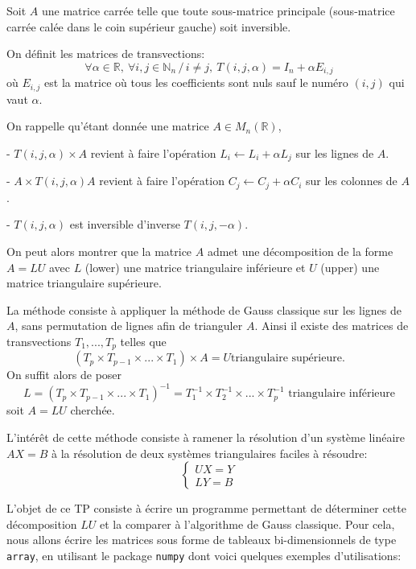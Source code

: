 \vskip1cm

Soit $A$ une matrice carrée telle que toute sous-matrice principale (sous-matrice carrée calée dans le coin supérieur gauche) soit inversible.

On définit les matrices de transvections: $$\forall \alpha\in {\mathbb R},\ \forall i,j\in {\mathbb N}_n\,/\,  i\ne j , \ T(i,j,\alpha)=I_n+\alpha E_{i,j}$$
où $E_{i,j}$ est la matrice où tous les coefficients sont nuls sauf le numéro $(i,j)$ qui vaut $\alpha$.

\medskip 

On rappelle qu'étant donnée une matrice $A\in M_{n}(\mathbb{R})$, 

- $T(i,j,\alpha)\times A$ revient à faire l'opération $L_i\leftarrow L_i+\alpha L_j$ sur les lignes de $A$.

- $A\times T(i,j,\alpha)A$ revient à faire l'opération $C_j\leftarrow C_j+\alpha C_i$ sur les colonnes de $A$.

- $T(i,j,\alpha)$ est inversible d'inverse $T(i,j,-\alpha)$.

\medskip 

On peut alors montrer que la matrice $A$ admet une décomposition de la forme $A=LU$ avec $L$ (lower) une matrice triangulaire inférieure et $U$ (upper) une matrice triangulaire supérieure.

\medskip 

La méthode consiste à appliquer la méthode de Gauss classique sur les lignes de $A$, sans permutation de lignes afin de trianguler $A$. Ainsi il existe des matrices de transvections $T_1,...,T_p$ telles que $$(T_p\times T_{p-1}\times ...\times T_1)\times A=U \textrm{triangulaire supérieure}.$$
On suffit alors de poser $$L=(T_p\times T_{p-1}\times ...\times T_1)^{-1}=T_1^{-1}\times T_2^{-1}\times ...\times T_p^{-1} \textrm{ triangulaire inférieure}$$ soit $A=LU$ cherchée.

\medskip L'intérêt de cette méthode consiste à ramener la résolution d'un système linéaire $AX=B$ à la résolution de deux systèmes triangulaires faciles à résoudre: $$\left\{\begin{array}{l}UX=Y\\LY=B\end{array}\right.$$

\vskip1cm

L'objet de ce TP consiste à écrire un programme permettant de déterminer cette décomposition $LU$ et la comparer à l'algorithme de Gauss classique.
Pour cela, nous allons écrire les matrices sous forme de tableaux bi-dimensionnels de type \texttt{array}, en utilisant le package \texttt{numpy} dont voici quelques exemples d'utilisations:

